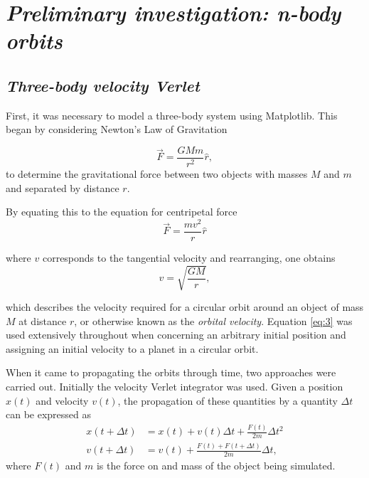 \documentclass[12pt, english]{report}
\begin{document}
\section{\textsl{Preliminary investigation: n-body orbits}}
\subsection{\textsl{Three-body velocity Verlet}}

\normalsize{\noindent First, it was necessary to model a three-body system using Matplotlib. This began by considering Newton's Law of Gravitation \cite{newton_principia_1999}

\begin{equation} \label{eq:1}
    \vec{F} = \frac{GMm}{r^2} \hat{r},
\end{equation}
to determine the gravitational force between two objects with masses $M$ and $m$ and separated by distance $r$.} By equating this to the equation for centripetal force \cite{newton_principia_1999} \begin{equation}
    \vec{F} = \frac{mv^2}{r} \hat{r}
\end{equation}

where $v$ corresponds to the tangential velocity and rearranging, one obtains 
\begin{equation} \label{eq:3}
    v = \sqrt{\frac{GM}{r}},
\end{equation}

which describes the velocity required for a circular orbit around an object of mass $M$ at distance $r$, or otherwise known as the \emph{orbital velocity}. Equation \ref{eq:3} was used extensively throughout when concerning an arbitrary initial position and assigning an initial velocity to a planet in a circular orbit. 


\normalsize{When it came to propagating the orbits through time, two approaches were carried out. Initially the velocity Verlet integrator \cite{bowler_phas0030_nodate} was used. Given a position $x(t)$ and velocity $v(t)$, the propagation of these quantities by a quantity $\Delta t$ can be expressed as 
\begin{align}
    x(t + \Delta t) &= x(t) + v(t)\Delta t  + \frac{F(t)}{2m} \Delta t^2 \\ 
    v(t + \Delta t) &= v(t) + \frac{F(t) + F(t + \Delta t)}{2m} \Delta t,
\end{align} where $F(t)$ and $m$ is the force on and mass of the object being simulated.}
\end{document}
